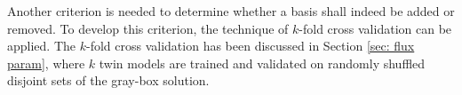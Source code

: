 Another criterion is needed to determine whether a basis shall indeed be added or removed.
To develop this criterion, the technique of $k$-fold cross validation can be applied.
The $k$-fold cross validation has been discussed in Section \ref{sec: flux param}, where
$k$ twin models are trained and validated on randomly shuffled disjoint sets of the
gray-box solution.
